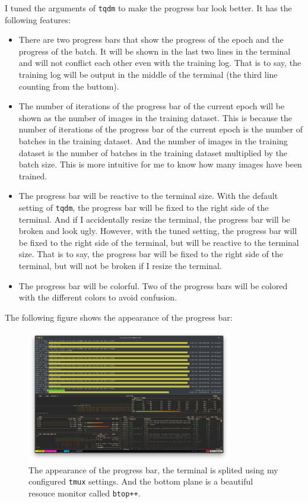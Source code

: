 I tuned the arguments of \texttt{tqdm} to make the progress bar look better.
It has the following features:
\begin{itemize}
    \item There are two progress bars that show the progress of the epoch and the progress of the batch.
          It will be shown in the last two lines in the terminal and will not conflict each other even with the training log.
          That is to say, the training log will be output in the middle of the terminal (the third line counting from the buttom).
    \item The number of iterations of the progress bar of the current epoch will be shown as the number of images in the training dataset.
          This is because the number of iterations of the progress bar of the current epoch is the number of batches in the training dataset.
          And the number of images in the training dataset is the number of batches in the training dataset multiplied by the batch size.
          This is more intuitive for me to know how many images have been trained.
    \item The progress bar will be reactive to the terminal size.
          With the default setting of \texttt{tqdm}, the progress bar will be fixed to the right side of the terminal.
          And if I accidentally resize the terminal, the progress bar will be broken and look ugly.
          However, with the tuned setting, the progress bar will be fixed to the right side of the terminal, but will be reactive to the terminal size.
          That is to say, the progress bar will be fixed to the right side of the terminal, but will not be broken if I resize the terminal.
    \item The progress bar will be colorful. Two of the progress bars will be colored with the different colors to avoid confusion.
\end{itemize}


The following figure shows the appearance of the progress bar:
\begin{figure}[H]
    \centering
    \includegraphics[width=0.8\textwidth]{./images/tqdm.png}
    \caption{The appearance of the progress bar, the terminal is splited using my configured \texttt{tmux} settings. And the bottom plane is a beautiful resouce monitor called \texttt{btop++}.}
\end{figure}

